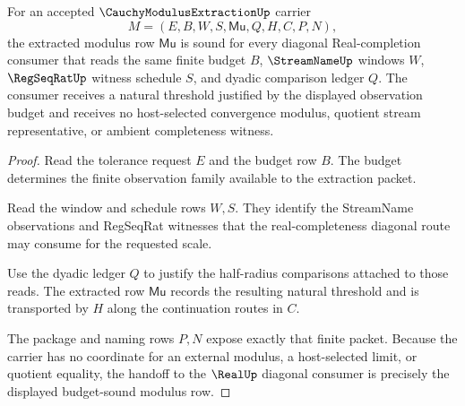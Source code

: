 \begin{theorem}
\label{thm:cauchy-modulus-extraction-budget-soundness}
For an accepted $\CauchyModulusExtractionUp$ carrier
$$
M=(E,B,W,S,\mathsf{Mu},Q,H,C,P,N),
$$
the extracted modulus row $\mathsf{Mu}$ is sound for every diagonal Real-completion consumer that reads the same finite budget $B$, $\StreamNameUp$ windows $W$, $\RegSeqRatUp$ witness schedule $S$, and dyadic comparison ledger $Q$. The consumer receives a natural threshold justified by the displayed observation budget and receives no host-selected convergence modulus, quotient stream representative, or ambient completeness witness.
\end{theorem}
\begin{proof}
Read the tolerance request $E$ and the budget row $B$. The budget determines the finite observation family available to the extraction packet.

Read the window and schedule rows $W,S$. They identify the StreamName observations and RegSeqRat witnesses that the real-completeness diagonal route may consume for the requested scale.

Use the dyadic ledger $Q$ to justify the half-radius comparisons attached to those reads. The extracted row $\mathsf{Mu}$ records the resulting natural threshold and is transported by $H$ along the continuation routes in $C$.

The package and naming rows $P,N$ expose exactly that finite packet. Because the carrier has no coordinate for an external modulus, a host-selected limit, or quotient equality, the handoff to the $\RealUp$ diagonal consumer is precisely the displayed budget-sound modulus row.
\end{proof}


